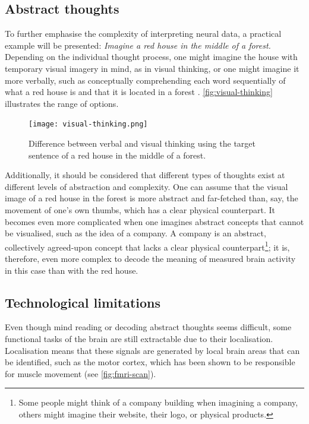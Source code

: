 \subsection{Abstract thoughts}
\label{chapter2-abstract-thoughts}

To further emphasise the complexity of interpreting neural data, a practical example will be presented: \textit{Imagine a red house in the middle of a forest.} Depending on the individual thought process, one might imagine the house with temporary visual imagery in mind, as in visual thinking, or one might imagine it more verbally, such as conceptually comprehending each word sequentially of what a red house is and that it is located in a forest \citep{amit_asymmetrical_2017}. \autoref{fig:visual-thinking} illustrates the range of options.

\begin{figure}[ht]
  \centering
  \texttt{[image: visual-thinking.png]}
  \caption{Difference between verbal and visual thinking using the target sentence of a red house in the middle of a forest.}
  \label{fig:visual-thinking}
\end{figure}

Additionally, it should be considered that different types of thoughts exist at different levels of abstraction and complexity. One can assume that the visual image of a red house in the forest is more abstract and far-fetched than, say, the movement of one's own thumbs, which has a clear physical counterpart. It becomes even more complicated when one imagines abstract concepts that cannot be visualised, such as the idea of a company. A company is an abstract, collectively agreed-upon concept that lacks a clear physical counterpart\footnote{Some people might think of a company building when imagining a company, others might imagine their website, their logo, or physical products.}; it is, therefore, even more complex to decode the meaning of measured brain activity in this case than with the red house.

\subsection{Technological limitations}
\label{chapter2-technological-limitations}

Even though mind reading or decoding abstract thoughts seems difficult, some functional tasks of the brain are still extractable due to their localisation. Localisation means that these signals are generated by local brain areas that can be identified, such as the motor cortex, which has been shown to be responsible for muscle movement (see \autoref{fig:fmri-scan}).

